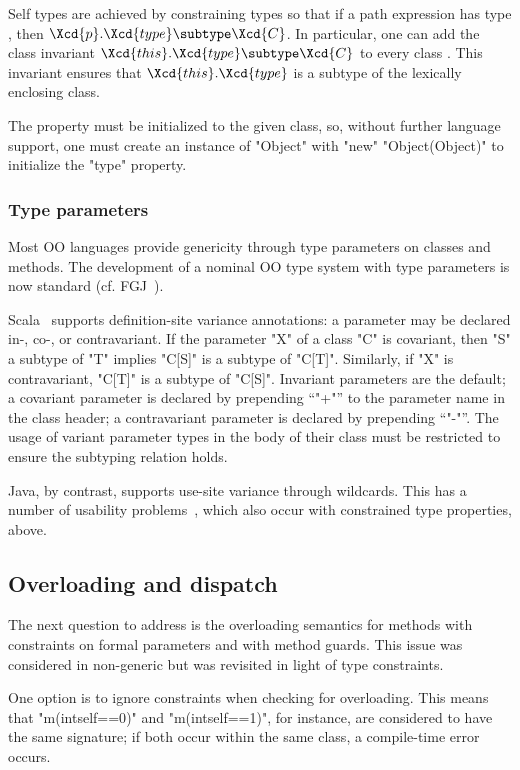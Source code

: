 Self types are achieved by
constraining types so that if a path expression 
has type , then
$\Xcd{p}.\Xcd{type} \subtype \Xcd{C}$.
In particular, one can add the class invariant
$\Xcd{this}.\Xcd{type} \subtype \Xcd{C}$ to every class .
This invariant ensures that
$\Xcd{this}.\Xcd{type}$ is a subtype
of the lexically enclosing class.

The property must be initialized to the given class, so, without
further language support, one must create an instance of
\xcd"Object" with \xcd"new" \xcd"Object(Object)" to initialize
the \xcd"type" property.

\subsubsection{Type parameters}

Most OO languages provide genericity through type parameters on
classes and methods.  The development of a nominal OO type
system with type parameters is now standard (cf.  FGJ~\cite{FJ}).

Scala~\cite{scala} supports definition-site variance
annotations:
a parameter may be declared in-, co-, or
contravariant.
If the parameter \xcd"X" of a class \xcd"C" is covariant,
then \xcd"S" a subtype of
\xcd"T" implies  \xcd"C[S]" is a subtype of \xcd"C[T]".
Similarly, if \xcd"X" is contravariant,
\xcd"C[T]" is a subtype of \xcd"C[S]".
Invariant parameters are the default; a covariant parameter is
declared by prepending ``\xcd"+"'' to the parameter name in the
class header; a contravariant parameter is declared by
prepending ``\xcd"-"''.  The usage of variant parameter types in
the body of their class must be
restricted to ensure the subtyping relation holds.

Java, by contrast, supports use-site variance through wildcards.
This has a number of usability problems~\cite{wildcards-are-evil},
which also occur with constrained type properties, above.

\subsection{Overloading and dispatch}

The next question to address is the overloading semantics for
methods with constraints on formal parameters and with method
guards.  This issue was considered in non-generic \Xten but was
revisited in light of type constraints.

One option is to ignore constraints when checking for
overloading.  This means that \xcd"m(int{self==0})" and
\xcd"m(int{self==1})", for instance, are considered to have the
same signature; if both occur within the same class, a
compile-time error occurs.

